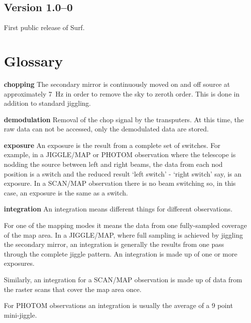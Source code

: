 \documentclass[twoside,11pt]{article}
\newcommand{\scusoft}          {{\sc Surf}}
\newcommand{\xlabel}[1]{}
\renewcommand{\_}{\texttt{\symbol{95}}}
\begin{document}
\subsection{Version 1.0--0}

First public release of \scusoft.


\clearpage

\section*{\xlabel{glossary}Glossary\label{glossary}}

\begin{description}

\item{{\bf chopping}} The secondary mirror is continuously moved on and off
source at approximately 7~Hz in order to remove the sky to zeroth order. This
is done in addition to standard jiggling.

\item{{\bf demodulation}} Removal of the chop signal by the transputers.
At this time, the raw data can not be accessed, only the demodulated data are
stored.

\item{{\bf exposure}} An exposure is the result from a complete set of
switches. For example, in a JIGGLE/MAP or PHOTOM observation where the
telescope is nodding the source between left and right beams, the data from
each nod position is a switch and the reduced result `left switch' - `right
switch' say, is an exposure. In a SCAN/MAP observation there is no beam
switching so, in this case, an exposure is the same as a switch.


\item{{\bf integration}} An integration means different things for different
observations.

For one of the mapping modes it means the data from one fully-sampled coverage
of the map area. In a JIGGLE/MAP, where full sampling is achieved by jiggling
the secondary mirror, an integration is generally the results from one pass
through the complete jiggle pattern. An integration is made up of one or more
exposures. 

Similarly, an integration for a SCAN/MAP observation is made up of data from
the raster scans that cover the map area once.

For PHOTOM observations an integration is usually the average of a 9 point
mini-jiggle.


\end{description}
\end{document}

